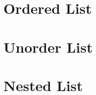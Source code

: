 \documentclass{article}
\begin{document}
	
	\section*{Ordered List}
	
	
	
	\section*{Unorder List}
	
	
	
	\section*{Nested List}
\end{document}
